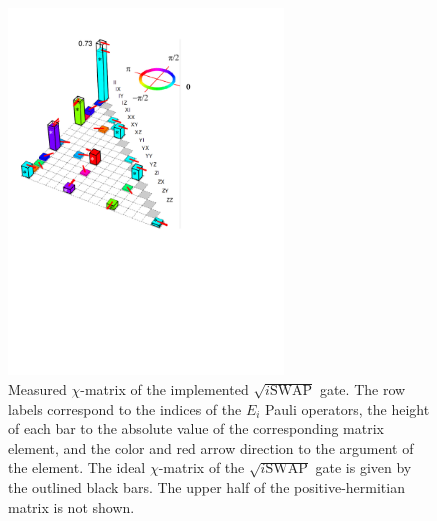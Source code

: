 \begin{figure} \includegraphics[width=0.65\textwidth]{./material/papers/iswap/figures/chi_matrix}
\caption[Measured $\chi$-matrix of the $\sqrt{i\textrm{SWAP}}$ gate]{Measured $\chi$-matrix of the implemented $\sqrt{i\mathrm{SWAP}}$ gate. The row labels correspond to the indices of the $E_{i}$ Pauli operators, the height of each bar to the absolute value of the corresponding matrix element, and the color and red arrow direction to the argument of the element. The ideal $\chi$-matrix of the $\sqrt{i\mathrm{SWAP}}$ gate is given by the outlined black bars. The upper half of the positive-hermitian matrix is not shown.}


\label{fig:gate_chi_matrix_and_errors} \end{figure}

